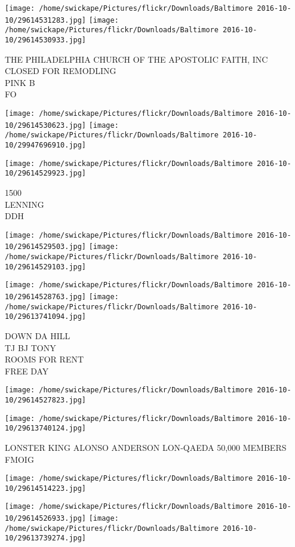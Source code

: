 \documentclass[10pt,letterpaper]{article}
\begin{document}
\texttt{[image: /home/swickape/Pictures/flickr/Downloads/Baltimore 2016-10-10/29614531283.jpg]}
\texttt{[image: /home/swickape/Pictures/flickr/Downloads/Baltimore 2016-10-10/29614530933.jpg]}

THE PHILADELPHIA CHURCH OF THE APOSTOLIC FAITH, INC\\
CLOSED FOR REMODLING\\
PINK B\\
FO
\pagebreak

\texttt{[image: /home/swickape/Pictures/flickr/Downloads/Baltimore 2016-10-10/29614530623.jpg]}
\texttt{[image: /home/swickape/Pictures/flickr/Downloads/Baltimore 2016-10-10/29947696910.jpg]}

\vspace{0.25in}
\texttt{[image: /home/swickape/Pictures/flickr/Downloads/Baltimore 2016-10-10/29614529923.jpg]}

1500\\
LENNING\\
DDH
\pagebreak

\texttt{[image: /home/swickape/Pictures/flickr/Downloads/Baltimore 2016-10-10/29614529503.jpg]}
\texttt{[image: /home/swickape/Pictures/flickr/Downloads/Baltimore 2016-10-10/29614529103.jpg]}

\texttt{[image: /home/swickape/Pictures/flickr/Downloads/Baltimore 2016-10-10/29614528763.jpg]}
\texttt{[image: /home/swickape/Pictures/flickr/Downloads/Baltimore 2016-10-10/29613741094.jpg]}

DOWN DA HILL\\
TJ BJ TONY\\
ROOMS FOR RENT\\
FREE DAY
\pagebreak

\texttt{[image: /home/swickape/Pictures/flickr/Downloads/Baltimore 2016-10-10/29614527823.jpg]}

\vspace{0.25in}
\texttt{[image: /home/swickape/Pictures/flickr/Downloads/Baltimore 2016-10-10/29613740124.jpg]}

LONSTER KING ALONSO ANDERSON LON{-}QAEDA 50,000 MEMBERS\\
FMOIG
\pagebreak

\texttt{[image: /home/swickape/Pictures/flickr/Downloads/Baltimore 2016-10-10/29614514223.jpg]}

\vspace{0.25in}
\texttt{[image: /home/swickape/Pictures/flickr/Downloads/Baltimore 2016-10-10/29614526933.jpg]}
\texttt{[image: /home/swickape/Pictures/flickr/Downloads/Baltimore 2016-10-10/29613739274.jpg]}
\end{document}
